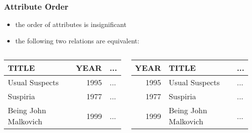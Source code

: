 \documentclass[dvipsnames]{beamer}
\theoremstyle{plain}
\begin{document}
\begin{frame}
  \frametitle{Attribute Order}

  \begin{itemize}
    \item the order of attributes is insignificant
  \end{itemize}

  \begin{example}
    \begin{itemize}
      \item the following two relations are equivalent:
    \end{itemize}

    \begin{columns}
      \begin{tiny}
      \begin{table}
        \begin{tabular}{|l|r|l|}\hline
TITLE                & YEAR & ...\\\hline\hline
Usual Suspects       & 1995 & ...\\\hline
Suspiria             & 1977 & ...\\\hline
Being John Malkovich & 1999 & ...\\\hline
        \end{tabular}
      \end{table}
      \end{tiny}

      \begin{tiny}
      \begin{table}
        \begin{tabular}{|r|l|l|}\hline
YEAR & TITLE                & ...\\\hline\hline
1995 & Usual Suspects       & ...\\\hline
1977 & Suspiria             & ...\\\hline
1999 & Being John Malkovich & ...\\\hline
        \end{tabular}
      \end{table}
      \end{tiny}
    \end{columns}
  \end{example}
\end{frame}
\end{document}
